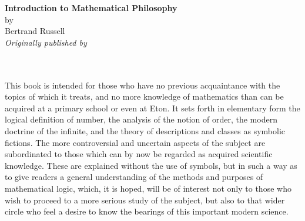     \begin{center}
    \vspace*{\titlepagetop}
    \Huge{\textbf{\ebkonly{\Large}\iphoneonly{\Large} Introduction to \iphoneonly{\\ \Large}Mathematical \iphoneonly{\\ \Large}Philosophy}}  \iphoneonly{\Large}\\
    \vspace*{\titlepageby}
    \Large{\ebkonly{\normalsize}\iphoneonly{\normalsize} by}\\
    \vspace*{\titlepageby} 
    \Large{\ebkonly{\normalsize}\iphoneonly{\normalsize} Bertrand Russell}\\
    \vspace*{\titlepagemiddle}
    \small{\iphoneonly{\scriptsize}\textit{Originally published by}}\\
    \iphoneonly{\scriptsize}\\
    \end{center}
%
\lxonly{\clearpage ~\setcounter{page}{0}}
\ebkonly{\pagestyle{empty}}
%
\newlength{\dustjacketspace}
\setlength{\dustjacketspace}{0.1\textheight}
\ebkonly{\setlength{\dustjacketspace}{0.05\textheight}}
\iphoneonly{\setlength{\dustjacketspace}{0\textheight}}
\clearpage\vspace*{\dustjacketspace}
\noindent{}\bigskip\\
\noindent This book is intended for those who have no previous acquaintance with the topics of which it treats, and no more knowledge of mathematics than can be acquired at a primary school or even at Eton. It sets forth in elementary form the logical definition of number, the analysis of the notion of order, the modern doctrine of the infinite, and the theory of descriptions and classes as symbolic fictions. The more controversial and uncertain aspects of the subject are subordinated to those which can by now be regarded as acquired scientific knowledge. These are explained without the use of symbols, but in such a way as to give readers a general understanding of the methods and purposes of mathematical logic, which, it is hoped, will be of interest not only to those who wish to proceed to a more serious study of the subject, but also to that wider circle who feel a desire to know the bearings of this important modern science.
